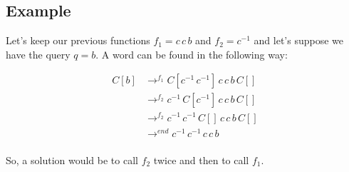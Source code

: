 \subsection{Example}

Let's keep our previous functions $f_1 = c \, c \, b$ and $f_2 = c^{-1}$ and let's suppose we have the query $q = b$. A word can be found in the following way:

\begin{equation}
\begin{split}
C[b] & \rightarrow^{f_1} C[c^{-1} \, c^{-1}] \, c \, c \, b \, C[]\\
     & \rightarrow^{f_2} c^{-1} \, C[c^{-1}] \, c \, c \, b \, C[]\\
     & \rightarrow^{f_2} c^{-1} \, c^{-1} \, C[] \, c \, c \, b \, C[]\\
     & \rightarrow^{end} c^{-1} \, c^{-1} \, c \, c \, b\\
\end{split}
\end{equation}

So, a solution would be to call $f_2$ twice and then to call $f_1$.